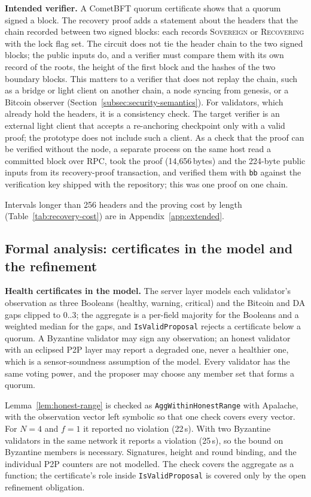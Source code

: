\textbf{Intended verifier.} A CometBFT quorum certificate shows that a quorum
signed a block. The recovery proof adds a statement about the headers
that the chain recorded between two signed blocks: each records \textsc{Sovereign}
or \textsc{Recovering} with the lock flag set. The circuit does not tie the header
chain to the two signed blocks; the public inputs do, and a verifier must compare
them with its own record of the roots, the height of the first block and the hashes
of the two boundary blocks. This matters to a verifier that
does not replay the chain, such as a bridge or light client on another chain,
a node syncing from genesis, or a Bitcoin observer
(Section~\ref{subsec:security-semantics}). For validators, which already hold
the headers, it is a consistency check. The target verifier is an external
light client that accepts a re-anchoring checkpoint only with a valid proof;
the prototype does not include such a client.
As a check that the proof can be verified without the node, a separate
process on the same host read a committed block over RPC, took the proof (14{,}656\,bytes) and
the 224-byte public inputs from its recovery-proof transaction, and verified them
with \texttt{bb} against the verification key shipped with the repository; this was
one proof on one chain.

Intervals longer than 256 headers and the proving cost by length (Table~\ref{tab:recovery-cost}) are in Appendix~\ref{app:extended}.


\subsection*{Formal analysis: certificates in the model and the refinement}

\textbf{Health certificates in the model.} The server layer models each
validator's observation as three Booleans (healthy, warning, critical) and the
Bitcoin and DA gaps clipped to $0..3$; the aggregate is a per-field majority for
the Booleans and a weighted median for the gaps, and \texttt{IsValidProposal}
rejects a certificate below a quorum. A Byzantine validator may sign any
observation; an honest validator with an eclipsed P2P layer may report a degraded
one, never a healthier one, which is a sensor-soundness assumption of the model.
Every validator has the same voting power, and the proposer may choose any member
set that forms a quorum.

Lemma~\ref{lem:honest-range} is checked as \texttt{AggWithinHonestRange} with Apalache, with the
observation vector left symbolic so that one check covers every vector. For
$N{=}4$ and $f{=}1$ it reported no violation (22\,s). With two Byzantine
validators in the same network it reports a violation (25\,s), so the bound
on Byzantine members is necessary. Signatures, height and round binding,
and the individual P2P counters are not modelled. The check covers the aggregate as a
function; the certificate's role inside \texttt{IsValidProposal} is covered
only by the open refinement obligation.

